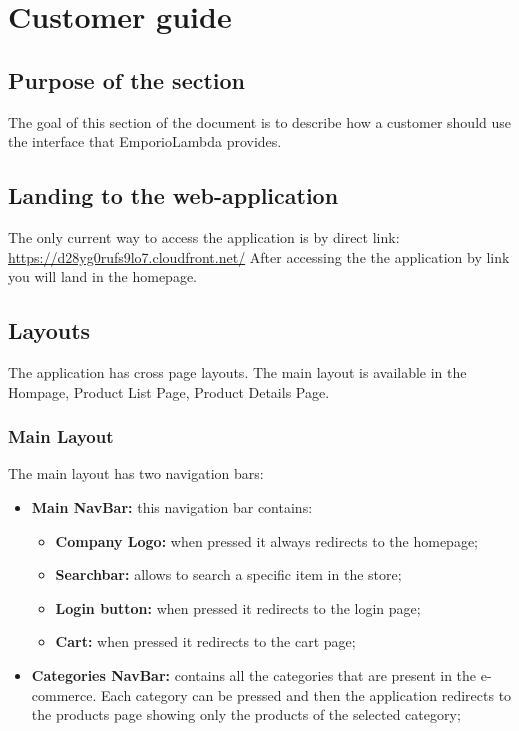 \section{Customer guide} \label{_cliente}
\subsection{Purpose of the section}
The goal of this section of the document is to describe how a customer should use the interface that EmporioLambda provides.

\subsection{Landing to the web-application}
The only current way to access the application is by direct link: \url{https://d28yg0rufs9lo7.cloudfront.net/}
After accessing the the application by link you will land in the homepage.

\subsection{Layouts}
The application has cross page layouts. The main layout is available in the Hompage, Product List Page, Product Details Page.

\subsubsection{Main Layout} \label{_mainLayout}
The main layout has two navigation bars:

\begin{itemize} 
    \item \textbf{Main NavBar:} this navigation bar contains: 
    \begin{itemize}
        \item \textbf{Company Logo:} when pressed it always redirects to the homepage;
        \item \textbf{Searchbar:} allows to search a specific item in the store;
        \item \textbf{Login button:} when pressed it redirects to the login page;
        \item \textbf{Cart:} when pressed it redirects to the cart page;
    \end{itemize}
    \item \textbf{Categories NavBar:} contains all the categories that are present in the e-commerce. Each category can be pressed and then the application redirects to the products page showing only the products of the selected category;
\end{itemize}

